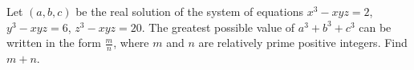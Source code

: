 Let $ (a,b,c)$ be the real solution of the system of equations $ x^3 - xyz = 2$, $ y^3 - xyz = 6$, $ z^3 - xyz = 20$. The greatest possible value of $ a^3 + b^3 + c^3$ can be written in the form $ \frac{m}{n}$, where $ m$ and $ n$ are relatively prime positive integers. Find $ m + n$.